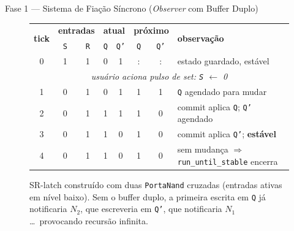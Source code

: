 \documentclass[11pt,a4paper]{article}
\begin{document}
\begin{phasebox}{Fase 1 — Sistema de Fiação Síncrono (\textit{Observer} com Buffer Duplo)}{}
\begin{figure}[H]
\renewcommand{\arraystretch}{1.1}
\begin{tabular}{c|cc|cc|cc|l}
\multirow{2}{*}{\textbf{tick}} & \multicolumn{2}{c|}{\textbf{entradas}} &
\multicolumn{2}{c|}{\textbf{atual}} &
\multicolumn{2}{c|}{\textbf{próximo}} &
\multirow{2}{*}{\textbf{observação}} \\
 & \texttt{S} & \texttt{R} & \texttt{Q} & \texttt{Q'} & \texttt{Q} & \texttt{Q'} & \\\hline
0 & 1 & 1 & 0 & 1 &:&:& estado guardado, estável \\\hline
\multicolumn{8}{c}{\itshape usuário aciona pulso de \emph{set}: \texttt{S} $\leftarrow$ 0} \\\hline
1 & 0 & 1 & 0 & 1 & \cellcolor{orange!15}1 & 1 & \texttt{Q} agendado para mudar \\
2 & 0 & 1 & \cellcolor{blue!15}1 & 1 & 1 & \cellcolor{orange!15}0 & commit aplica \texttt{Q}; \texttt{Q'} agendado \\
3 & 0 & 1 & 1 & \cellcolor{blue!15}0 & 1 & 0 & commit aplica \texttt{Q'}; \textbf{estável} \\
4 & 0 & 1 & 1 & 0 & 1 & 0 & sem mudança $\Rightarrow$ \texttt{run\_until\_stable} encerra \\
\end{tabular}
\renewcommand{\arraystretch}{1.0}

\caption{SR-latch construído com duas \texttt{PortaNand} cruzadas (entradas ativas em nível baixo). Sem o buffer duplo, a primeira escrita em \texttt{Q} já notificaria $N_2$, que escreveria em \texttt{Q'}, que notificaria $N_1$ \dots\ provocando recursão infinita.}
\label{fig:feedback}
\end{figure}


\end{phasebox}
\end{document}
